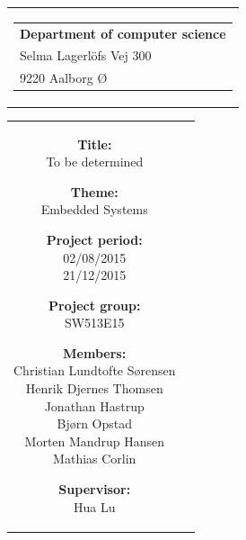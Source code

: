 
\thispagestyle{empty}

{\samepage 
\begin{tabular}{r}
	\parbox{\textwidth}{  
	\hfill \parbox{7cm}{\begin{tabular}{l} %
		{\small \textbf{Department of computer science}}\\
		{\small Selma Lagerlöfs Vej 300} \\
		{\small 9220 Aalborg Ø}
	\end{tabular}}
	}
\end{tabular}

\begin{tabular}{cc}
	\parbox{8cm}{
	\begin{description}
		\item { \textbf{Title:}}\\ 
			To be determined
    		\item { \textbf{Theme:}}\\ 
			Embedded Systems\\
	\end{description}
	
	\parbox{8cm}{
	\begin{description}
		\item { \textbf{Project period:}}\\
			02/08/2015\\
			21/12/2015\\
 		\hspace{4cm}
		\item { \textbf{Project group:}}\\
  			SW513E15\\
 		\hspace{4cm}
		\item {\textbf{Members:}}\\
            Christian Lundtofte Sørensen\\
            Henrik Djernes Thomsen\\
            Jonathan Hastrup\\
            Bjørn Opstad\\
            Morten Mandrup Hansen\\
            Mathias Corlin\\
		\hspace{2cm}
		\item { \textbf{Supervisor:}}\\
 			Hua Lu\\
  	\end{description} 
	}

}
\end{tabular}}
